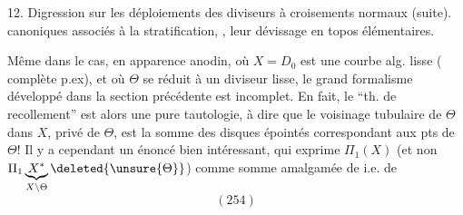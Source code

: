 12. Digression sur les déploiements des diviseurs à croisements normaux (suite).   canoniques associés à la stratification, , leur dévissage en topos élémentaires.

 Même dans le cas, en apparence anodin, où $X=D_0$ est une courbe alg.  lisse ( complète p.ex), et où $\Theta$ se réduit à un diviseur lisse, le grand formalisme développé dans la section précédente est incomplet. En fait, le ``th. de recollement'' est alors une pure tautologie,     à dire que le voisinage tubulaire de $\Theta$ dans $X$, privé de $\Theta$, est la somme des  disques épointés correspondant aux pts de $\Theta$! Il y a cependant un énoncé bien intéressant, qui exprime \deleted{$\unsure{\Pi}$} $\Pi_1(X)$ (et non $\Pi_1\underbrace{X^*}_{X\setminus\Theta}\deleted{\unsure{\Theta}}$) comme somme amalgamée de
i.e. de
\[
(254)
\]
\margin{--}
